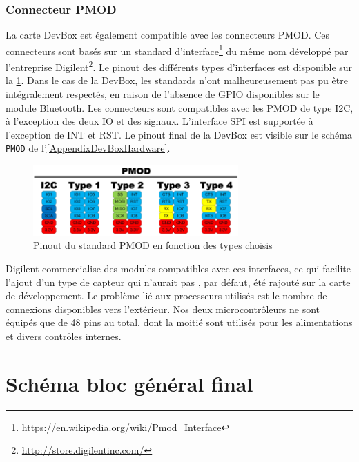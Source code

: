\subsubsection{Connecteur PMOD}
\label{sec-pmod_connector}

La carte DevBox est également compatible avec les connecteurs PMOD. Ces connecteurs sont basés sur un standard d'interface\footnote{\url{https://en.wikipedia.org/wiki/Pmod_Interface}} du même nom développé par l'entreprise Digilent\footnote{\url{http://store.digilentinc.com/}}. Le pinout des différents types d'interfaces est disponible sur la \cref{fig-pmod_type_pinout}. Dans le cas de la DevBox, les standards n'ont malheureusement pas pu être intégralement respectés, en raison de l'absence de GPIO disponibles sur le module Bluetooth. Les connecteurs sont compatibles avec les PMOD de type I2C, à l'exception des deux IO et des signaux. L'interface SPI est supportée à l'exception de INT et RST. Le pinout final de la DevBox est visible sur le schéma \texttt{PMOD} de l'\cref{AppendixDevBoxHardware}.\\

\begin{figure}[ht!]
    \centering
    \includegraphics[width=0.7\textwidth]{Figures/Hardware/pmod_type_pinout.png}
    \caption{Pinout du standard PMOD en fonction des types choisis}
    \label{fig-pmod_type_pinout}
\end{figure}

Digilent commercialise des modules compatibles avec ces interfaces, ce qui facilite l'ajout d'un type de capteur qui n'aurait pas , par défaut, été rajouté sur la carte de développement. Le problème lié aux processeurs utilisés est le nombre de connexions disponibles vers l'extérieur. Nos deux microcontrôleurs ne sont équipés que de 48 pins au total, dont la moitié sont utilisés pour les alimentations et divers contrôles internes.

\FloatBarrier


\section{Schéma bloc général final}



